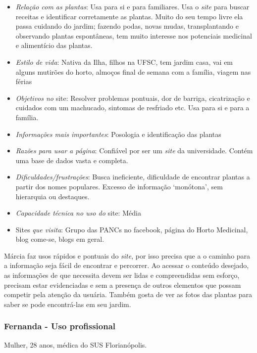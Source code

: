 \begin{itemize}
\item
  \emph{Relação com as plantas}: Usa para si e para familiares. Usa o \emph{site} para buscar receitas e identificar corretamente as plantas. Muito do seu tempo livre ela passa cuidando do jardim; fazendo podas, novas mudas, transplantando e observando plantas espontâneas, tem muito interesse nos potenciais medicinal e alimentício das plantas.
\item
  \emph{Estilo de vida}: Nativa da Ilha, filhos na UFSC, tem jardim casa, vai em alguns mutirões do horto, almoços final de semana com a família, viagem nas férias
\item
  \emph{Objetivos no} site: Resolver problemas pontuais, dor de barriga, cicatrização e cuidados com um machucado, sintomas de resfriado etc. Usa para si e para a família.
\item
  \emph{Informações mais importantes}: Posologia e identificação das plantas
\item
  \emph{Razões para usar a página}: Confiável por ser um \emph{site} da universidade. Contém uma base de dados vasta e completa.
\item
  \emph{Dificuldades/frustrações}: Busca ineficiente, dificuldade de encontrar plantas a partir dos nomes populares. Excesso de informação `monótona', sem hierarquia ou destaques.
\item
  \emph{Capacidade técnica no uso do} site: Média
\item
  Sites \emph{que visita}: Grupo das PANCs no facebook, página do Horto Medicinal, blog come-se, blogs em geral.
\end{itemize}

Márcia faz usos rápidos e pontuais do \emph{site}, por isso precisa que a o caminho para a informação seja fácil de encontrar e percorrer. Ao acessar o conteúdo desejado, as informações de que necessita devem ser lidas e compreendidas sem esforço, precisam estar evidenciadas e sem a presença de outros elementos que possam competir pela atenção da usuária. Também gosta de ver as fotos das plantas para saber se pode encontrá-las em seu jardim.

\subsubsection{Fernanda - Uso profissional}

Mulher, 28 anos, médica do SUS Florianópolis.

